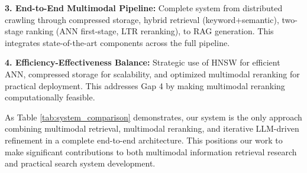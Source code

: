 \textbf{3. End-to-End Multimodal Pipeline:} Complete system from distributed crawling through compressed storage, hybrid retrieval (keyword+semantic), two-stage ranking (ANN first-stage, LTR reranking), to RAG generation. This integrates state-of-the-art components across the full pipeline.

\textbf{4. Efficiency-Effectiveness Balance:} Strategic use of HNSW for efficient ANN, compressed storage for scalability, and optimized multimodal reranking for practical deployment. This addresses Gap 4 by making multimodal reranking computationally feasible.

As Table \ref{tab:system_comparison} demonstrates, our system is the only approach combining multimodal retrieval, multimodal reranking, and iterative LLM-driven refinement in a complete end-to-end architecture. This positions our work to make significant contributions to both multimodal information retrieval research and practical search system development.